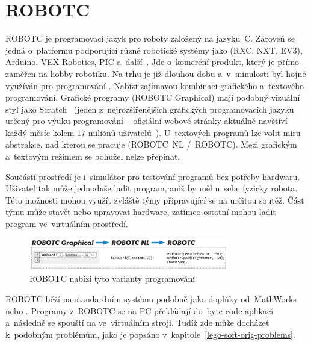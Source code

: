 \section{ROBOTC}

ROBOTC je programovací jazyk pro roboty založený na jazyku~C. 
Zároveň se jedná o~platformu podporující různé robotické systémy jako \legoM{} (RXC, NXT, EV3), Arduino, VEX Robotics, PIC a~další~\cite{legoProgramingPlatform_ROBOTC}.
Jde o~komerční produkt, který je přímo zaměřen na hobby robotiku.
Na trhu je již dlouhou dobu a~v~minulosti byl hojně využíván pro programování \legoNXT{}.
Nabízí zajímavou kombinaci grafického a~textového programování. 
Grafické programy (ROBOTC Graphical) mají podobný vizuální styl jako Scratch~\cite{scratch_oficial-about} (jeden z~nejrozšířenějších grafických programovacích jazyků určený pro výuku programování -- oficiální webové stránky aktuálně navštíví každý měsíc kolem 17 miliónů uživatelů~\cite{scratch_oficial-statistic}). 
U~textových programů lze volit míru abstrakce, nad kterou se pracuje (ROBOTC~NL /~ROBOTC). 
Mezi grafickým a~textovým režimem se bohužel nelze přepínat.

Součástí prostředí je i~simulátor pro testování programů bez potřeby hardwaru. 
Uživatel tak může jednoduše ladit program, aniž by měl u~sebe fyzicky robota.
Této možnosti mohou využít zvláště týmy připravující se na určitou soutěž. 
Část týmu může stavět nebo upravovat hardware, zatímco ostatní mohou ladit program ve~virtuálním prostředí. 

\begin{figure}[h]
	\centering
	\includegraphics[width=330px]{images/robotc_language-variants.png}
	\caption[ROBOTC nabízí tyto varianty programování]{ROBOTC nabízí tyto varianty programování\protect\footnotemark} %
	\label{robotc_language-variants}
\end{figure}


ROBOTC běží na standardním \lego{} systému podobně jako doplňky od~MathWorks nebo \NI{}.
Programy z~ROBOTC se na PC překládají do~byte-code aplikací a~následně se spouští na  ve~virtuálním stroji. 
Tudíž zde může docházet k~podobným problémům, jako je popsáno v~kapitole~\ref{lego-soft-orig-problems}.

